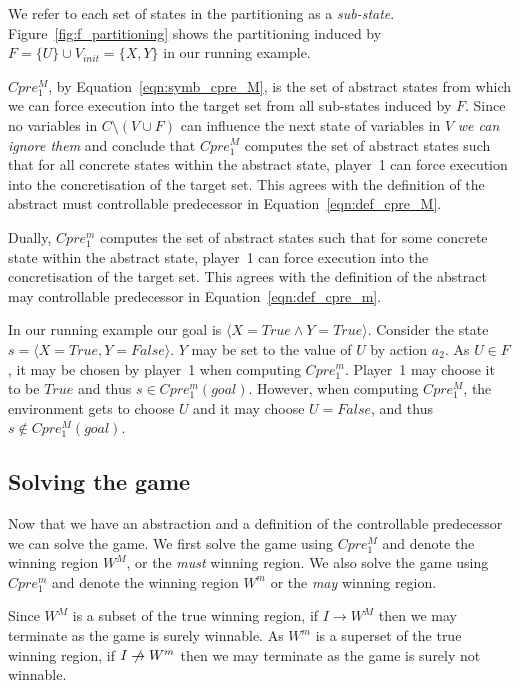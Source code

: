 We refer to each set of states in the partitioning as a \emph{sub-state}. Figure~\ref{fig:f_partitioning} shows the partitioning induced by $F=\{U\} \cup V_{init}=\{X, Y\}$ in our running example.

$Cpre_1^M$, by Equation~\ref{eqn:symb_cpre_M}, is the set of abstract states from which we can force execution into the target set from all sub-states induced by $F$. Since no variables in $C \setminus (V \cup F)$ can influence the next state of variables in $V$ \emph{we can ignore them} and conclude that $Cpre_1^M$ computes the set of abstract states such that for all concrete states within the abstract state, player~1 can force execution into the concretisation of the target set. This agrees with the definition of the abstract must controllable predecessor in Equation~\ref{eqn:def_cpre_M}.

Dually, $Cpre_1^m$ computes the set of abstract states such that for some concrete state within the abstract state, player~1 can force execution into the concretisation of the target set. This agrees with the definition of the abstract may controllable predecessor in Equation~\ref{eqn:def_cpre_m}.

In our running example our goal is $\langle X=True \land Y=True \rangle$. Consider the state $s = \langle X=True, Y=False \rangle$. $Y$ may be set to the value of $U$ by action $a_2$. As $U \in F$, it may be chosen by player~1 when computing $Cpre_1^m$. Player~1 may choose it to be $True$ and thus $s \in Cpre_1^m(goal)$. However, when computing $Cpre_1^M$, the environment gets to choose $U$ and it may choose $U=False$, and thus $s \notin Cpre_1^M(goal)$.

\subsection{Solving the game}

Now that we have an abstraction and a definition of the controllable predecessor we can solve the game. We first solve the game using $Cpre_1^M$ and denote the winning region $W^M$, or the \emph{must} winning region. We also solve the game using $Cpre_1^m$ and denote the winning region $W^m$ or the \emph{may} winning region.

Since $W^M$ is a subset of the true winning region, if $I \rightarrow W^M$ then we may terminate as the game is surely winnable. As $W^m$ is a superset of the true winning region, if $I \centernot\rightarrow W^m$ then we may terminate as the game is surely not winnable.

